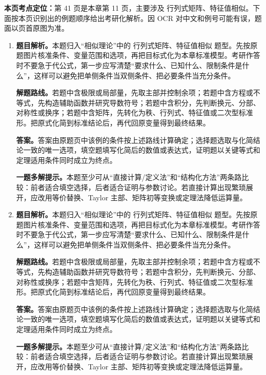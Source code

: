 \begin{solutionblock}
\textbf{本页考点定位：}第 41 页是本章第 11 页，主要涉及 行列式矩阵、特征值相似。下面按本页识别出的例题顺序给出考研化解析。因 OCR 对中文和例号可能有误，题面以页首原图为准。

\begin{enumerate}[label=\textbf{例\arabic*.}, leftmargin=2.4em]

\item \textbf{题目解析。}本题归入“相似理论”中的 行列式矩阵、特征值相似 题型。先按原题图片核准条件、变量范围和选项，再把目标式化为本章标准模型。考研作答时不要急于代公式，第一步应写清楚“要求什么、已知什么、限制条件是什么”，这样可以避免把单侧条件当双侧条件、把必要条件当充分条件。

\textbf{解题路线。}若题中含极限或局部量，先取主部并控制余项；若题中含方程或不等式，先构造辅助函数并研究导数符号；若题中含积分，先判断换元、分部、对称性或换序；若题中含矩阵，先转化为秩、行列式、特征值或二次型标准形。把原式化简到标准结论后，再代回原变量得到最终结果。

\textbf{答案。}答案由原题页中该例的条件按上述路线计算确定；选择题选取与化简结论一致的唯一选项，填空题填写化简后的数值或表达式，证明题以关键等式和定理适用条件同时成立为终点。

\textbf{一题多解提示。}本题至少可从“直接计算/定义法”和“结构化方法”两条路比较：前者适合填空选择，后者适合证明与参数讨论。若直接计算出现繁琐展开，应改用等价替换、Taylor 主部、矩阵初等变换或定理法降低运算量。

\item \textbf{题目解析。}本题归入“相似理论”中的 行列式矩阵、特征值相似 题型。先按原题图片核准条件、变量范围和选项，再把目标式化为本章标准模型。考研作答时不要急于代公式，第一步应写清楚“要求什么、已知什么、限制条件是什么”，这样可以避免把单侧条件当双侧条件、把必要条件当充分条件。

\textbf{解题路线。}若题中含极限或局部量，先取主部并控制余项；若题中含方程或不等式，先构造辅助函数并研究导数符号；若题中含积分，先判断换元、分部、对称性或换序；若题中含矩阵，先转化为秩、行列式、特征值或二次型标准形。把原式化简到标准结论后，再代回原变量得到最终结果。

\textbf{答案。}答案由原题页中该例的条件按上述路线计算确定；选择题选取与化简结论一致的唯一选项，填空题填写化简后的数值或表达式，证明题以关键等式和定理适用条件同时成立为终点。

\textbf{一题多解提示。}本题至少可从“直接计算/定义法”和“结构化方法”两条路比较：前者适合填空选择，后者适合证明与参数讨论。若直接计算出现繁琐展开，应改用等价替换、Taylor 主部、矩阵初等变换或定理法降低运算量。

\end{enumerate}
\end{solutionblock}




